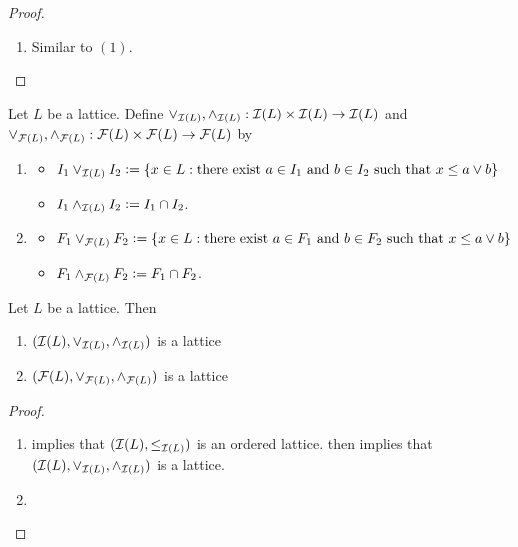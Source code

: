 \documentclass{book}
\begin{document}
\begin{proof}
\begin{enumerate}
\begin{enumerate}
				\begin{align*}
					\inf (\{I_1, I_2\}, \leq_{\MI(L)})
					& \leq \inf (\{I_1, I_2\}, \subset) \\
					& = I_1 \cap I_2 \\
					& \leq \inf (\{I_1, I_2\}, \leq_{\MI(L)}).
				\end{align*} 
				Hence $I_1 \cap I_2 = \inf (\{I_1, I_2\}, \leq_{\MI(L)})$. 
			\end{enumerate}
			\item Similar to $(1)$.  
		\end{enumerate}
	\end{proof}
	
	\begin{defn}
		Let $L$ be a lattice. Define $\vee_{\mathcal{I}(L)}, \wedge_{\mathcal{I}(L)}: \mathcal{I}(L) \times \mathcal{I}(L) \rightarrow \mathcal{I}(L)$ and $\vee_{\mathcal{F}(L)}, \wedge_{\mathcal{F}(L)}: \mathcal{F}(L) \times \mathcal{F}(L) \rightarrow \mathcal{F}(L)$ by 
		\begin{enumerate}
			\item 
			\begin{itemize}
				\item $I_1 \vee_{\mathcal{I}(L)} I_2 \vcentcolon= \{x \in L: \text{there exist $a \in I_1$ and $b \in I_2$ such that $x \leq a \vee b$} \}$
				\item $I_1 \wedge_{\mathcal{I}(L)} I_2 \vcentcolon= I_1 \cap I_2$. 
			\end{itemize}
			\item {}
			\begin{itemize}
				\item $F_1 \vee_{\mathcal{F}(L)} F_2 \vcentcolon= \{x \in L: \text{there exist $a \in F_1$ and $b \in F_2$ such that $x \leq a \vee b$} \}$
				\item $F_1 \wedge_{\mathcal{F}(L)} F_2 \vcentcolon= F_1 \cap F_2$. 
			\end{itemize}
		\end{enumerate}
	\end{defn}
	
	\begin{ex}
		Let $L$ be a lattice. Then 
		\begin{enumerate}
			\item $(\mathcal{I}(L), \vee_{\mathcal{I}(L)}, \wedge_{\mathcal{I}(L)})$ is a lattice 
			\item $(\mathcal{F}(L), \vee_{\mathcal{F}(L)}, \wedge_{\mathcal{F}(L)})$ is a lattice 
		\end{enumerate}
	\end{ex}
	
	\begin{proof}\
		\begin{enumerate}
			\item {} implies that $(\mathcal{I}(L), \leq_{\mathcal{I}(L)})$ is an ordered lattice.  then implies that $(\mathcal{I}(L), \vee_{\mathcal{I}(L)}, \wedge_{\mathcal{I}(L)})$ is a lattice. 
			\item 
		\end{enumerate}
	\end{proof}
	
\end{document}
